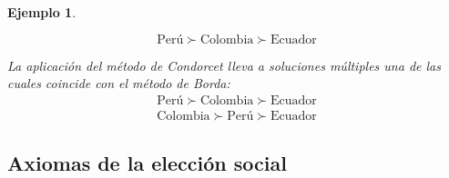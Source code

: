 \documentclass[a5paper,doc,10pt,noapacite]{apa6}
\newtheorem{ejem}{Ejemplo}
\begin{document}
{{\begin{ejem}
\begin{figure}[H]
\centering
\begin{floatrow}
	\fontsize{7}{11}\selectfont
	\captionsetup{justification=centering, labelfont=footnotesize, font=footnotesize}
\end{floatrow}
\end{figure}

\vspace{-1\baselineskip}
\[
	\text{Perú} \succ \text{Colombia} \succ \text{Ecuador}
\]

La aplicación del método de Condorcet lleva a soluciones múltiples una de las cuales coincide con el método de Borda:
\begin{align*}
	\text{Perú} \succ \text{Colombia} \succ \text{Ecuador}
\\
	\text{Colombia} \succ \text{Perú} \succ \text{Ecuador}
\end{align*}

\end{ejem}

\subsection{Axiomas de la elección social}

}}
\end{document}

